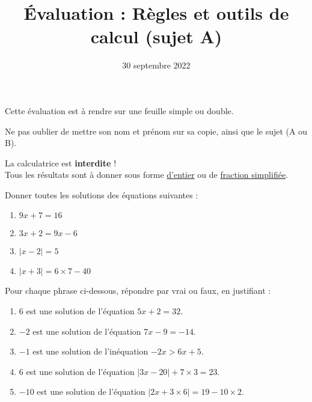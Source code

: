 \documentclass[
	classe=$2^{de}$,
	headerTitle=Évaluation\space Chapitre\space 1,
	surFeuille
]{évaluation}
\title{Évaluation : Règles et outils de calcul (sujet A)}
\date{30 septembre 2022}
\begin{document}
\maketitle

\begin{tcolorbox}
	Cette évaluation est à rendre sur une feuille simple ou double.

	Ne pas oublier de mettre son nom et prénom sur sa copie, ainsi que le sujet (A ou B).

	La calculatrice est \textbf{interdite} ! \\

	Tous les résultats sont à donner sous forme \uline{d'entier} ou de \uline{fraction simplifiée}.
\end{tcolorbox}

\begin{exercice}
	Donner toutes les solutions des équations suivantes :
	\begin{multicols}{2}
		\begin{enumerate}
			\item $9x + 7 = 16$
			\item $3x + 2 = 9x - 6$
			\item $|x - 2| = 5$
			\item $|x + 3| = 6 × 7 - 40$
		\end{enumerate}
	\end{multicols}
\end{exercice}

\begin{exercice}
	Pour chaque phrase ci-dessous, répondre par vrai ou faux, en justifiant :
	\begin{enumerate}
		\item $6$ est une solution de l'équation $5x + 2 = 32$.
		\item $-2$ est une solution de l'équation $7x - 9 = -14$.
		\item $-1$ est une solution de l'inéquation $-2x > 6x + 5$.
		\item $6$ est une solution de l'équation $|3x - 20| + 7 × 3 = 23$.
		\item $-10$ est une solution de l'équation $|2x + 3 × 6| = 19 - 10 × 2$.
	\end{enumerate}
\end{exercice}
\end{document}
